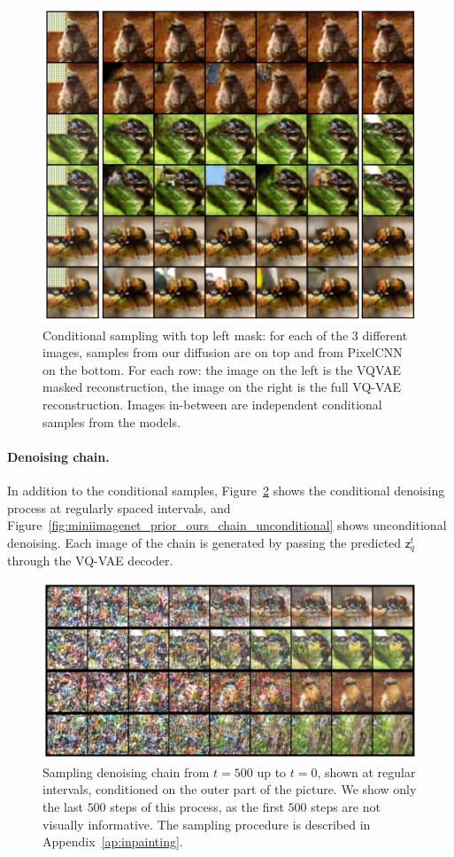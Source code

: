 \documentclass{article}
\theoremstyle{plain}
\theoremstyle{definition}
\theoremstyle{remark}
\newcommand{\latentdis}{\mathsf{z}_q}
\begin{document}
\begin{figure}
    \centering
    \includegraphics[width=.8\linewidth]{./cond_samples_topleft.pdf}

    \caption{Conditional sampling with top left mask: for each of the 3 different images, samples from our diffusion are on top and from PixelCNN on the bottom. For each row: the image on the left is the VQVAE masked reconstruction, the image on the right is the full VQ-VAE reconstruction. Images in-between are independent conditional samples from the models.}
    \label{fig:miniimagenet_prior_ours_conditional:topleft}
\end{figure}


\paragraph{Denoising chain. }
In addition to the conditional samples, Figure~\ref{fig:miniimagenet_prior_ours_chain} shows the conditional denoising process at regularly spaced intervals, and Figure~\ref{fig:miniimagenet_prior_ours_chain_unconditional} shows unconditional denoising. Each image of the chain is generated by passing the predicted $\latentdis^t$ through the VQ-VAE decoder.

\begin{figure}
    \centering
    \includegraphics[width=.8\linewidth]{./chains2.pdf}
    \caption{Sampling denoising chain from $t=500$ up to $t=0$, shown at regular intervals, conditioned on the outer part of the picture. We show only the last $500$ steps of this process, as the first $500$ steps are not visually informative. The sampling procedure is described in Appendix~\ref{ap:inpainting}.}
    \label{fig:miniimagenet_prior_ours_chain}
\end{figure}
\end{document}
